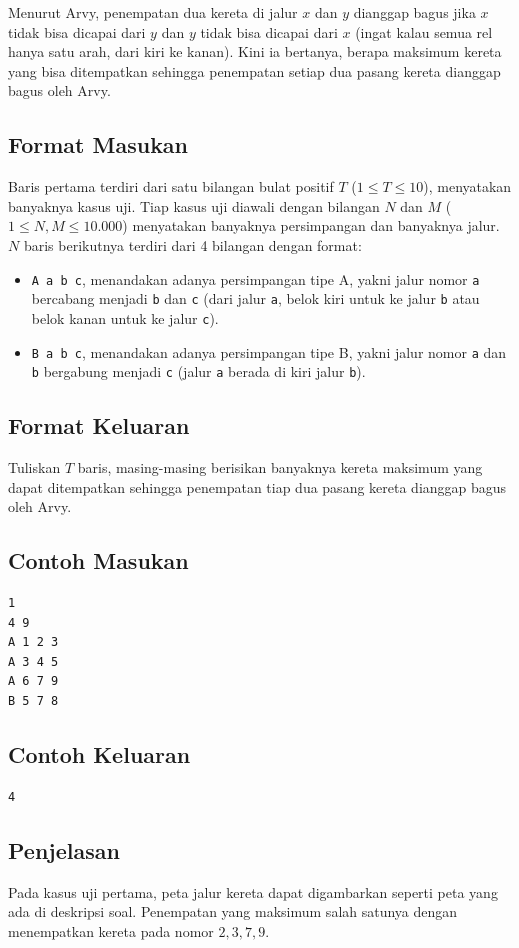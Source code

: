 \documentclass{article}
\begin{document}
Menurut Arvy, penempatan dua kereta di jalur $x$ dan $y$ dianggap bagus jika $x$ tidak bisa dicapai dari $y$ dan $y$ tidak bisa dicapai dari $x$ (ingat kalau semua rel hanya satu arah, dari kiri ke kanan).
Kini ia bertanya, berapa maksimum kereta yang bisa ditempatkan sehingga penempatan setiap dua pasang kereta dianggap bagus oleh Arvy.

\subsection*{Format Masukan}
Baris pertama terdiri dari satu bilangan bulat positif $T$ ($1 \leq T \leq 10$), menyatakan banyaknya kasus uji.
Tiap kasus uji diawali dengan bilangan $N$ dan $M$ ($1 \leq N, M \leq 10.000$) menyatakan banyaknya persimpangan dan banyaknya jalur.
$N$ baris berikutnya terdiri dari 4 bilangan dengan format:
\begin{itemize}
    \setlength{\itemsep}{0pt}
    \item \lstinline{A a b c}, menandakan adanya persimpangan tipe A, yakni jalur nomor \lstinline{a} bercabang menjadi \lstinline{b} dan \lstinline{c} (dari jalur \lstinline{a}, belok kiri untuk ke jalur \lstinline{b} atau belok kanan untuk ke jalur \lstinline{c}).
    \item \lstinline{B a b c}, menandakan adanya persimpangan tipe B, yakni jalur nomor \lstinline{a} dan \lstinline{b} bergabung menjadi \lstinline{c} (jalur \lstinline{a} berada di kiri jalur \lstinline{b}).
\end{itemize}

\subsection*{Format Keluaran}
Tuliskan $T$ baris, masing-masing berisikan banyaknya kereta maksimum yang dapat ditempatkan sehingga penempatan tiap dua pasang kereta dianggap bagus oleh Arvy.

\pagebreak

\begin{multicols}{2}
\subsection*{Contoh Masukan}
\begin{lstlisting}
1
4 9
A 1 2 3
A 3 4 5
A 6 7 9
B 5 7 8
\end{lstlisting}
\columnbreak
\subsection*{Contoh Keluaran}
\begin{lstlisting}
4
\end{lstlisting}
\vfill
\null
\end{multicols}

\subsection*{Penjelasan}
Pada kasus uji pertama, peta jalur kereta dapat digambarkan seperti peta yang ada di deskripsi soal. Penempatan yang maksimum salah satunya dengan menempatkan kereta pada nomor $2, 3, 7, 9$.
\end{document}
